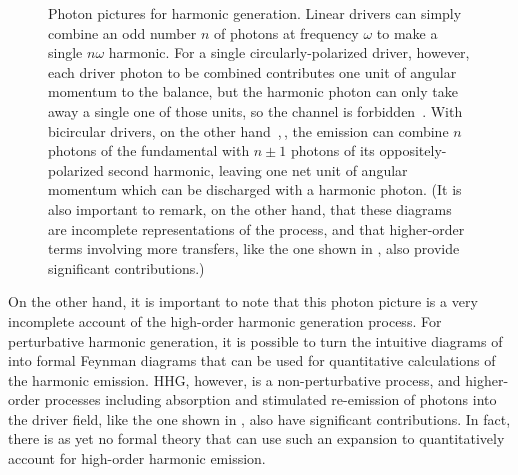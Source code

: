 \begin{figure}[b!]
  \centering
  \subfloat[]{
    
    \label{f8-initial-photon-diagrams-a}
  }
  \hspace{5mm}
  \subfloat[]{
    
    \label{f8-initial-photon-diagrams-b}
  }
  \hspace{5mm}
  \subfloat[]{
    
    \label{f8-initial-photon-diagrams-c}
  }
  \hspace{5mm}
  \subfloat[]{
    
    \label{f8-initial-photon-diagrams-d}
  }
  \hspace{5mm}
  \subfloat[]{
    
    \label{f8-initial-photon-diagrams-e}
  }
  
  \caption[
  Photon pictures for harmonic generation in linear, circular and bicircular fields
  ]{
  Photon pictures for harmonic generation. Linear drivers \protect{} can simply combine an odd number $n$ of photons at frequency $\omega$ to make a single $n\omega$ harmonic. For a single circularly-polarized driver, however, each driver photon to be combined contributes one unit of angular momentum to the balance, but the harmonic photon can only take away a single one of those units, so the channel is forbidden~\protect{}. With bicircular drivers, on the other hand~\protect{},\,\protect{}, the emission can combine $n$ photons of the fundamental with $n\pm1$ photons of its oppositely-polarized second harmonic, leaving one net unit of angular momentum which can be discharged with a harmonic photon. (It is also important to remark, on the other hand, that these diagrams are incomplete representations of the process, and that higher-order terms involving more transfers, like the one shown in \protect{}, also provide significant contributions.)
  }
\label{f8-initial-photon-diagrams}
\end{figure}




On the other hand, it is important to note that this photon picture is a very incomplete account of the high-order harmonic generation process. For perturbative harmonic generation, it is possible to turn the intuitive diagrams of  into formal Feynman diagrams that can be used for quantitative calculations of the harmonic emission. HHG, however, is a non-perturbative process, and higher-order processes including absorption and stimulated re-emission of photons into the driver field, like the one shown in , also have significant contributions. In fact, there is as yet no formal theory that can use such an expansion to quantitatively account for high-order harmonic emission.

